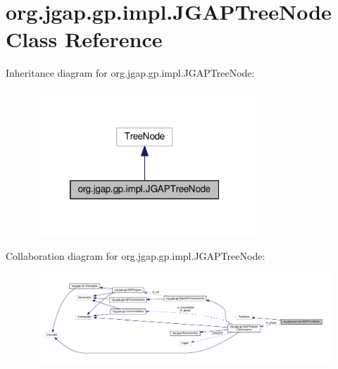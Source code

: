 \hypertarget{classorg_1_1jgap_1_1gp_1_1impl_1_1_j_g_a_p_tree_node}{\section{org.\-jgap.\-gp.\-impl.\-J\-G\-A\-P\-Tree\-Node Class Reference}
\label{classorg_1_1jgap_1_1gp_1_1impl_1_1_j_g_a_p_tree_node}
}


Inheritance diagram for org.\-jgap.\-gp.\-impl.\-J\-G\-A\-P\-Tree\-Node\-:
\nopagebreak
\begin{figure}[H]
\begin{center}
\leavevmode
\includegraphics[width=236pt]{classorg_1_1jgap_1_1gp_1_1impl_1_1_j_g_a_p_tree_node__inherit__graph}
\end{center}
\end{figure}


Collaboration diagram for org.\-jgap.\-gp.\-impl.\-J\-G\-A\-P\-Tree\-Node\-:
\nopagebreak
\begin{figure}[H]
\begin{center}
\leavevmode
\includegraphics[width=350pt]{classorg_1_1jgap_1_1gp_1_1impl_1_1_j_g_a_p_tree_node__coll__graph}
\end{center}
\end{figure}
